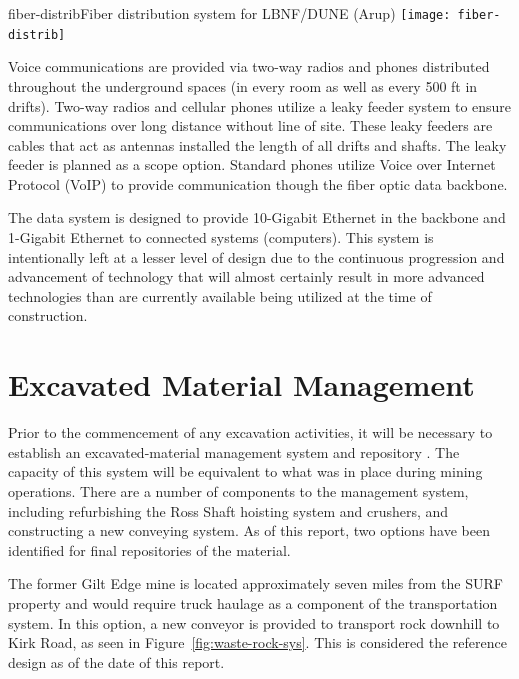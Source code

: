 \begin{cdrfigure}{fiber-distrib}{Fiber distribution system for LBNF/DUNE (Arup)}
\texttt{[image: fiber-distrib]}
\end{cdrfigure}

Voice communications are provided via two-way radios and phones distributed throughout the underground spaces (in every room as well as every 500 ft in drifts). Two-way radios and cellular phones utilize a leaky feeder system to ensure communications over long distance without line of site. These leaky feeders are cables that act as antennas installed the length of all drifts and shafts. The leaky feeder is planned as a scope option.  Standard phones utilize Voice over Internet Protocol (VoIP) to provide communication though the fiber optic data backbone.

The data system is designed to provide 10-Gigabit Ethernet in the backbone and 1-Gigabit Ethernet to connected systems (computers). This system is intentionally left at a lesser level of design due to the continuous progression and advancement of technology that will almost certainly result in more advanced technologies than are currently available being utilized at the time of construction.

\section{Excavated Material Management}
\label{sec:fscf-und-waste-rock}

Prior to the commencement of any excavation activities, it will be necessary to establish an excavated-material management system and repository . The capacity of this system will be equivalent to what was in place during mining operations. 
There are a number of components to the management system, including refurbishing the Ross Shaft hoisting system and %
crushers, and constructing a new conveying system.  As of this report, two options have been identified for final repositories of the material.  

The former Gilt Edge mine is located approximately seven miles from the SURF property and would require truck haulage as a component of the transportation system.  In this option, a new conveyor is provided to transport rock downhill to Kirk Road, as seen in Figure~\ref{fig:waste-rock-sys}. This is considered the reference design as of the date of this report.

